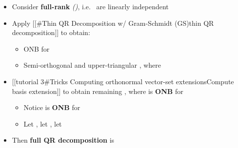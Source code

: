 \begin{itemize}

\item
  Consider \textbf{full-rank}
  \emph{()},
  i.e.~
  are linearly independent
\item
  Apply {[}{[}\#Thin QR Decomposition w/ Gram-Schmidt (GS)\textbar thin
  QR decomposition{]}{]} to obtain:

  \begin{itemize}
  
  \item
    ONB
    for 
  \item
    Semi-orthogonal
    and upper-triangular ,
    where 
  \end{itemize}
\item
  {[}{[}tutorial 3\#Tricks Computing orthonormal vector-set
  extensions\textbar Compute basis extension{]}{]} to obtain remaining
  ,
  where 
  is \textbf{ONB} for 

  \begin{itemize}
  
  \item
    Notice
     is
    \textbf{ONB} for 
  \item
    Let
    ,
    let , let
  \end{itemize}
\item
  Then \textbf{full QR decomposition} is

  \begin{itemize}
  

\end{itemize}
\end{itemize}
